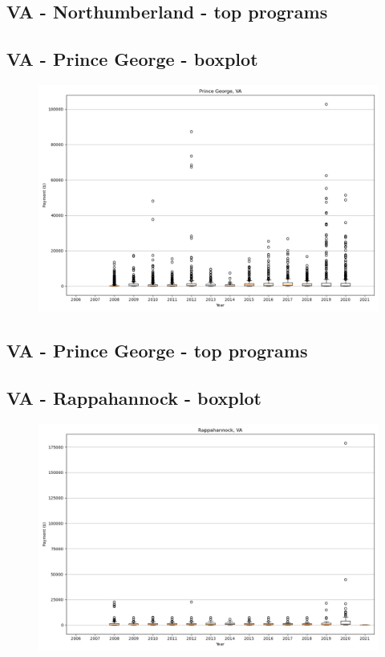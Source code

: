 \subsection*{VA - Northumberland - top programs}

\newpage
\subsection*{VA - Prince George - boxplot}
\begin{figure}[h]
\centering
\includegraphics[width=7in]{../output/boxplots/counties/Prince George-VA_boxplot.png}
\end{figure}


\subsection*{VA - Prince George - top programs}

\newpage
\subsection*{VA - Rappahannock - boxplot}
\begin{figure}[h]
\centering
\includegraphics[width=7in]{../output/boxplots/counties/Rappahannock-VA_boxplot.png}
\end{figure}



